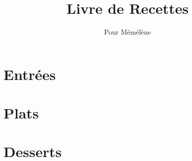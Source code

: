 \documentclass{recipe-book}
\title{Livre de Recettes}
\author{Pour Mémélène}
\date{}
\begin{document}
\chapter{Entrées}
%
\chapter{Plats}

\chapter{Desserts}
\end{document}
